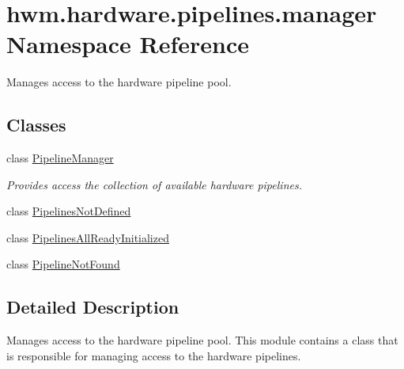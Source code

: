 \hypertarget{namespacehwm_1_1hardware_1_1pipelines_1_1manager}{\section{hwm.\-hardware.\-pipelines.\-manager Namespace Reference}
\label{namespacehwm_1_1hardware_1_1pipelines_1_1manager}
}


Manages access to the hardware pipeline pool.  


\subsection*{Classes}
\begin{DoxyCompactItemize}
\item 
class \hyperlink{classhwm_1_1hardware_1_1pipelines_1_1manager_1_1_pipeline_manager}{Pipeline\-Manager}
\begin{DoxyCompactList}\small\item\em Provides access the collection of available hardware pipelines. \end{DoxyCompactList}\item 
class \hyperlink{classhwm_1_1hardware_1_1pipelines_1_1manager_1_1_pipelines_not_defined}{Pipelines\-Not\-Defined}
\item 
class \hyperlink{classhwm_1_1hardware_1_1pipelines_1_1manager_1_1_pipelines_all_ready_initialized}{Pipelines\-All\-Ready\-Initialized}
\item 
class \hyperlink{classhwm_1_1hardware_1_1pipelines_1_1manager_1_1_pipeline_not_found}{Pipeline\-Not\-Found}
\end{DoxyCompactItemize}


\subsection{Detailed Description}
Manages access to the hardware pipeline pool. This module contains a class that is responsible for managing access to the hardware pipelines. 